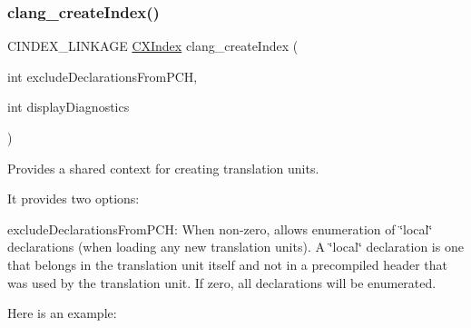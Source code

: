 \subsubsection{\texorpdfstring{clang\+\_\+create\+Index()}{clang\_createIndex()}}
{\footnotesize\ttfamily C\+I\+N\+D\+E\+X\+\_\+\+L\+I\+N\+K\+A\+GE \mbox{\hyperlink{group__CINDEX_gae039c2574bfd75774ca7a9a3e55910cb}{C\+X\+Index}} clang\+\_\+create\+Index (\begin{DoxyParamCaption}\item[{int}]{exclude\+Declarations\+From\+P\+CH,  }\item[{int}]{display\+Diagnostics }\end{DoxyParamCaption})}



Provides a shared context for creating translation units. 

It provides two options\+:


\begin{DoxyItemize}
\item exclude\+Declarations\+From\+P\+CH\+: When non-\/zero, allows enumeration of \char`\"{}local\char`\"{} declarations (when loading any new translation units). A \char`\"{}local\char`\"{} declaration is one that belongs in the translation unit itself and not in a precompiled header that was used by the translation unit. If zero, all declarations will be enumerated.
\end{DoxyItemize}

Here is an example\+:


